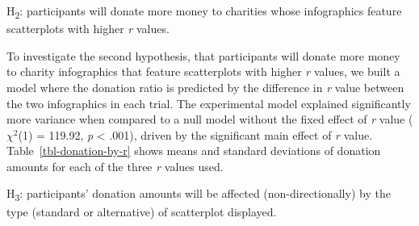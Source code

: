 \documentclass[
  authoryear,
  preprint,
  3p]{elsarticle}
\begin{document}

\hspace{0pt}
\begin{tcolorbox}[colback=nicegreen, colframe=gray!50, boxrule=0.5pt]
  H\textsubscript{2}: participants will donate more money to charities whose infographics feature scatterplots with higher \textit{r} values.
\end{tcolorbox}
\hspace{0pt}

To investigate the second hypothesis, that participants will donate more
money to charity infographics that feature scatterplots with higher
\emph{r} values, we built a model where the donation ratio is predicted
by the difference in \emph{r} value between the two infographics in each
trial. The experimental model explained significantly more variance when
compared to a null model without the fixed effect of \emph{r} value
(\(\chi^2\)(1) = 119.92, \emph{p} \textless{} .001), driven by the
significant main effect of \emph{r} value. Table~\ref{tbl-donation-by-r}
shows means and standard deviations of donation amounts for each of the
three \emph{r} values used.

\begin{table}

\caption{\label{tbl-donation-by-r}Means and standard deviations of
donation allocation amounts for each \textit{r} value used.}


\end{table}%


\hspace{0pt}
\begin{tcolorbox}[colback=nicegreen, colframe=gray!50, boxrule=0.5pt]
  H\textsubscript{3}: participants' donation amounts will be affected (non-directionally) by the type (standard or alternative) of scatterplot displayed.
\end{tcolorbox}
\hspace{0pt}
\end{document}
